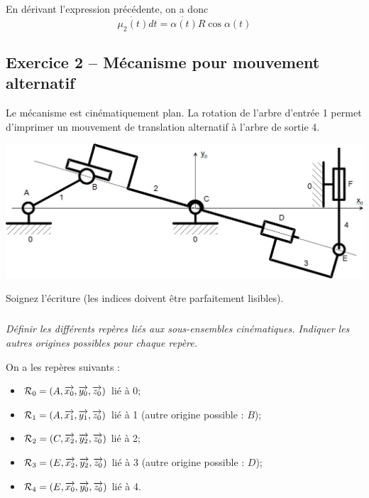 \documentclass[10pt,fleqn]{article} %
\begin{document}
\begin{multicols}{2}
\ifprof
\begin{corrige}
En dérivant l'expression précédente, on a donc 
$$\dot{\mu_2(t)}{dt}=\dot{\alpha(t)}R\cos\alpha(t) $$
\end{corrige}
\else \fi


\subsection*{Exercice 2 -- Mécanisme pour mouvement alternatif}
\setcounter{exo}{0}
 Le mécanisme est cinématiquement plan. La rotation de l'arbre d'entrée 1 permet d'imprimer un mouvement de translation alternatif à l'arbre de sortie 4.
\begin{center}
\includegraphics[width=.95\linewidth]{images/fig2_1} 
\end{center}



\begin{rem}
Soignez l'écriture (les indices doivent être parfaitement lisibles).
\end{rem}

\subparagraph{}
\textit{Définir les différents repères liés aux sous-ensembles cinématiques. Indiquer les autres origines possibles pour chaque repère.}


\ifprof
\begin{corrige}
On a les repères suivants :
\begin{itemize}
\item $\mathcal{R}_0=\left(A,\overrightarrow{x_0},\overrightarrow{y_0},\overrightarrow{z_0} \right)$ lié à 0;
\item $\mathcal{R}_1=\left(A,\overrightarrow{x_1},\overrightarrow{y_1},\overrightarrow{z_0} \right)$ lié à 1 (autre origine possible : $B$);
\item $\mathcal{R}_2=\left(C,\overrightarrow{x_2},\overrightarrow{y_2},\overrightarrow{z_0}\right)$ lié à 2;
\item $\mathcal{R}_3=\left(E,\overrightarrow{x_2},\overrightarrow{y_2},\overrightarrow{z_0}\right)$ lié à 3 (autre origine possible : $D$);
\item $\mathcal{R}_4=\left(E,\overrightarrow{x_0},\overrightarrow{y_0},\overrightarrow{z_0} \right)$ lié à 4.
\end{itemize}
\end{corrige}
\else \fi



\end{multicols}
\end{document}
